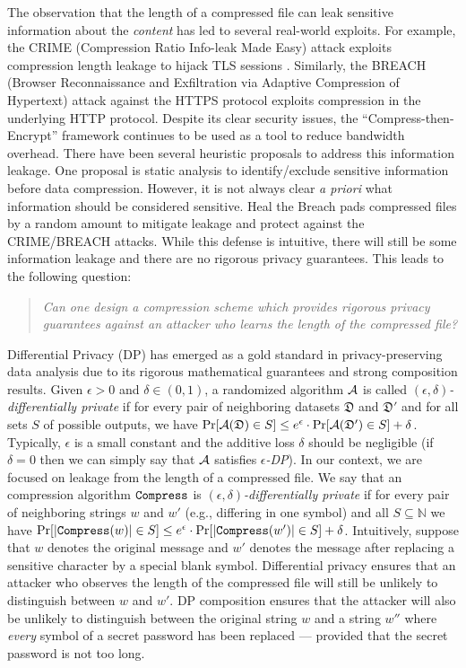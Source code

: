 The observation that the length of a compressed file can leak sensitive information about the {\em content} has led to several real-world exploits. For example, the CRIME (Compression Ratio Info-leak Made Easy) attack \cite{RizDuo12} exploits compression length leakage to hijack TLS sessions \cite{Fis12}. Similarly, the BREACH (Browser Reconnaissance and Exfiltration via Adaptive Compression of Hypertext) attack \cite{GluHarPra13} against the HTTPS protocol exploits compression in the underlying HTTP protocol. Despite its clear security issues, the  ``Compress-then-Encrypt'' framework continues to be used as a tool to reduce bandwidth overhead. There have been several heuristic proposals to address this information leakage. One proposal \cite{paulsen2019debreach} is static analysis to identify/exclude sensitive information before data compression. However, it is not always clear {\em a priori} what information should be considered sensitive. Heal the Breach \cite{palacios2022htb} pads compressed files by a random amount to mitigate leakage and protect against the CRIME/BREACH attacks. While this defense is intuitive, there will still be some information leakage and there are no rigorous privacy guarantees. This leads to the following question: 

\begin{quote}
    \emph{Can one design a compression scheme which provides rigorous privacy guarantees against an attacker who learns the length of the compressed file?}
\end{quote}

Differential Privacy (DP) \cite{TCC:DMNS06} has emerged as a gold standard in privacy-preserving data analysis due to its rigorous mathematical guarantees and strong composition results. Given $\epsilon>0$ and $\delta\in(0,1)$, a randomized algorithm ${\mathcal{A}}$ is called \emph{$(\epsilon,\delta)$-differentially private} if for every pair of neighboring datasets $\mathfrak{D}$ and $\mathfrak{D}'$ and for all sets $S$ of possible outputs, we have $\Pr[{\mathcal{A}}(\mathfrak{D})\in S]\leq e^\epsilon\cdot\Pr[{\mathcal{A}}(\mathfrak{D}')\in S]+\delta$. Typically, $\epsilon$ is a small constant and the additive loss $\delta$ should be negligible (if $\delta=0$ then we can simply say that ${\mathcal{A}}$ satisfies \emph{$\epsilon$-DP}). In our context, we are focused on leakage from the length of a compressed file. We say that an compression algorithm $\mathtt{Compress}$ is  \emph{$(\epsilon,\delta)$-differentially private} if for every pair of neighboring strings $w$ and $w'$ (e.g., differing in one symbol) and all $S \subseteq \mathbb{N}$ we have  $\Pr[\left| \mathtt{Compress}(w)\right|\in S]\leq e^\epsilon\cdot\Pr[\left| \mathtt{Compress}(w')\right|\in S]+\delta$. Intuitively, suppose that $w$ denotes the original message and $w'$ denotes the message after replacing a sensitive character by a special blank symbol. Differential privacy ensures that an attacker who observes the length of the compressed file will still be unlikely to distinguish between $w$ and $w'$. DP composition ensures that the attacker will also be unlikely to distinguish between the original string $w$ and a string $w''$ where {\em every} symbol of a secret password has been replaced --- provided that the secret password is not too long.  


